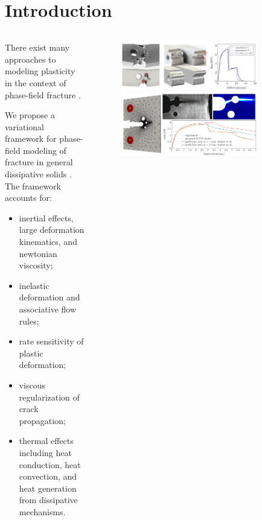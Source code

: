 \section{Introduction}

\begin{frame}
  \begin{columns}
    \begin{column}{0.5\textwidth}
      There exist many approaches to modeling plasticity in the context of phase-field fracture \cite{alessi_gradient_2014, alessi_gradient_2015, alessi_coupling_2018, ambati_phase-field_2015, ambati2016phase, miehe_phase_2016, borden2016phase, borden_phase-field_2017}.
      
      \bigskip
      
      We propose a variational framework for phase-field modeling of fracture in general dissipative solids \cite{hu2021variational,talamini2021attaining}. The framework accounts for:
      \begin{itemize}
        \item inertial effects, large deformation kinematics, and newtonian viscosity;
        \item inelastic deformation and associative flow rules;
        \item rate sensitivity of plastic deformation;
        \item viscous regularization of crack propagation;
        \item thermal effects including heat conduction, heat convection, and heat generation from dissipative mechanisms.
      \end{itemize}
    \end{column}
    \begin{column}{0.5\textwidth}
      \vspace{-3em}
      \begin{figure}
        \centering
        \includegraphics[width=0.83\textwidth]{introduction/figures/3pb}
        \includegraphics[width=0.83\textwidth]{introduction/figures/SFC}

\end{figure}
\end{column}
\end{columns}
\end{frame}
